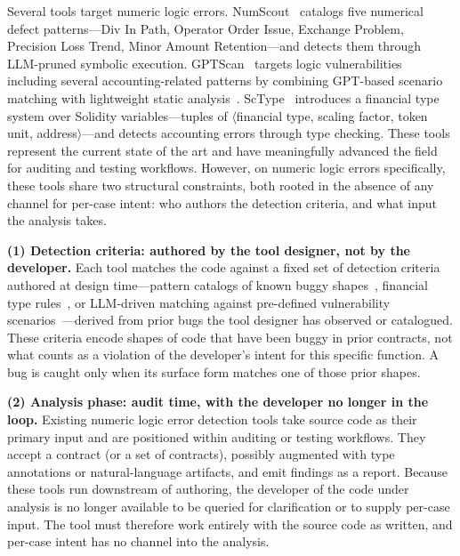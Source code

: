 \documentclass[pdflatex,sn-basic]{sn-jnl}%
\theoremstyle{thmstyleone}%
\theoremstyle{thmstyletwo}%
\theoremstyle{thmstylethree}%
\begin{document}
Several tools target numeric logic errors.
NumScout~\citep{numscout} catalogs five numerical defect patterns---Div In Path, Operator Order Issue, Exchange Problem, Precision Loss Trend, Minor Amount Retention---and detects them through LLM-pruned symbolic execution.
GPTScan~\citep{gptscan} targets logic vulnerabilities including several accounting-related patterns by combining GPT-based scenario matching with lightweight static analysis~\citep{slither}.
ScType~\citep{sctype} introduces a financial type system over Solidity variables---tuples of $\langle$financial type, scaling factor, token unit, address$\rangle$---and detects accounting errors through type checking.
These tools represent the current state of the art and have meaningfully advanced the field for auditing and testing workflows.
However, on numeric logic errors specifically, these tools share two structural constraints, both rooted in the absence of any channel for per-case intent: who authors the detection criteria, and what input the analysis takes.

\smallskip
\noindent\textbf{(1) Detection criteria: authored by the tool designer, not by the developer.}
Each tool matches the code against a fixed set of detection criteria authored at design time---pattern catalogs of known buggy shapes~\citep{numscout}, financial type rules~\citep{sctype}, or LLM-driven matching against pre-defined vulnerability scenarios~\citep{gptscan}---derived from prior bugs the tool designer has observed or catalogued.
These criteria encode shapes of code that have been buggy in prior contracts, not what counts as a violation of the developer's intent for this specific function. A bug is caught only when its surface form matches one of those prior shapes.

\smallskip
\noindent\textbf{(2) Analysis phase: audit time, with the developer no longer in the loop.}
Existing numeric logic error detection tools take source code as their primary input and are positioned within auditing or testing workflows.
They accept a contract (or a set of contracts), possibly augmented with type annotations or natural-language artifacts, and emit findings as a report.
Because these tools run downstream of authoring, the developer of the code under analysis is no longer available to be queried for clarification or to supply per-case input. The tool must therefore work entirely with the source code as written, and per-case intent has no channel into the analysis.
\end{document}

